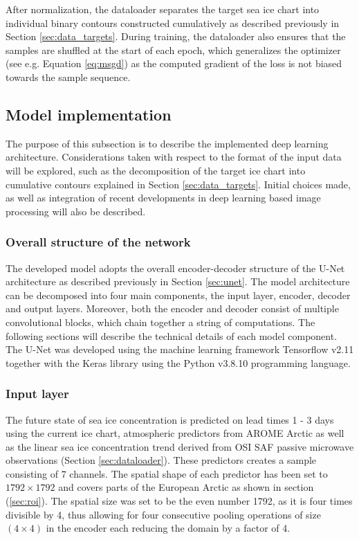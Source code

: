 \documentclass[../main/thesis]{subfiles}
\begin{document}
After normalization, the dataloader separates the target sea ice chart into individual binary contours constructed cumulatively as described previously in Section \ref{sec:data_targets}. During training, the dataloader also ensures that the samples are shuffled at the start of each epoch, which generalizes the optimizer (see e.g. Equation \ref{eq:msgd}) as the computed gradient of the loss is not biased towards the sample sequence.

\subsection{Model implementation}
\label{sec:implementation}
The purpose of this subsection is to describe the implemented deep learning architecture. Considerations taken with respect to the format of the input data will be explored, such as the decomposition of the target ice chart into cumulative contours explained in Section \ref{sec:data_targets}. Initial choices made, as well as integration of recent developments in deep learning based image processing will also be described.

\subsubsection{Overall structure of the network}
The developed model adopts the overall encoder-decoder structure of the U-Net architecture as described previously in Section \ref{sec:unet}. The model architecture can be decomposed into four main components, the input layer, encoder, decoder and output layers. Moreover, both the encoder and decoder consist of multiple convolutional blocks, which chain together a string of computations. The following sections will describe the technical details of each model component. The U-Net was developed using the machine learning framework Tensorflow v2.11 \citep{tensorflow2015-whitepaper} together with the Keras library \citep{chollet2015keras} using the Python v3.8.10 programming language. 

\subsubsection{Input layer}
The future state of sea ice concentration is predicted on lead times 1 - 3 days using the current ice chart, atmospheric predictors from AROME Arctic as well as the linear sea ice concentration trend derived from OSI SAF passive microwave observations (Section \ref{sec:dataloader}). These predictors creates a sample consisting of 7 channels. The spatial shape of each predictor has been set to $1792 \times 1792$ and covers parts of the European Arctic as shown in section (\ref{sec:roi}). The spatial size was set to be the even number 1792, as it is four times divisible by 4, thus allowing for four consecutive pooling operations of size $(4 \times 4)$ in the encoder \citep{Ronneberger2015} each reducing the domain by a factor of 4. 
\end{document}
